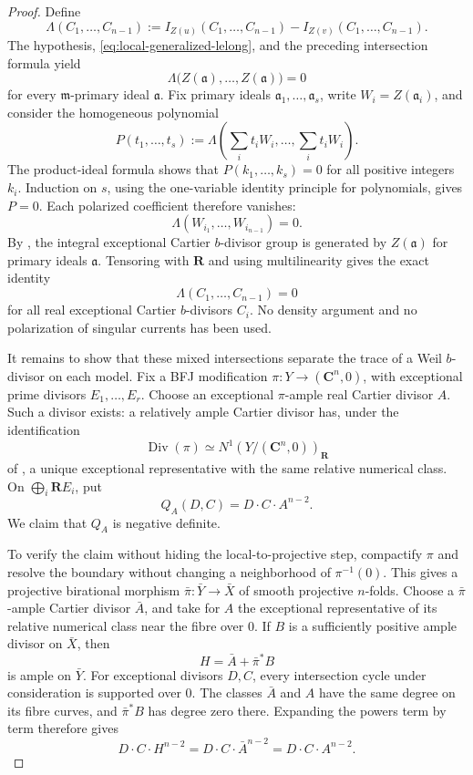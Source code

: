 \begin{proof}
Define
\[
 \Lambda(C_1,\ldots,C_{n-1})
 :=I_{Z(u)}(C_1,\ldots,C_{n-1})
   -I_{Z(v)}(C_1,\ldots,C_{n-1}).
\]
The hypothesis, \eqref{eq:local-generalized-lelong}, and the preceding
intersection formula yield
\[
 \Lambda\bigl(Z(\mathfrak a),\ldots,Z(\mathfrak a)\bigr)=0
\]
for every \(\mathfrak m\)-primary ideal \(\mathfrak a\).
Fix primary ideals \(\mathfrak a_1,\ldots,\mathfrak a_s\), write
\(W_i=Z(\mathfrak a_i)\), and consider the homogeneous polynomial
\[
 P(t_1,\ldots,t_s)
 :=\Lambda\!\left(\sum_i t_iW_i,\ldots,\sum_i t_iW_i\right).
\]
The product-ideal formula shows that
\(P(k_1,\ldots,k_s)=0\) for all positive integers \(k_i\).  Induction on
\(s\), using the one-variable identity principle for polynomials, gives
\(P=0\).  Each polarized coefficient therefore vanishes:
\[
             \Lambda(W_{i_1},\ldots,W_{i_{n-1}})=0.
\]
By \cite[Proposition~1.14]{BFJ08}, the integral exceptional Cartier
\(b\)-divisor group is generated by \(Z(\mathfrak a)\) for primary ideals
\(\mathfrak a\).  Tensoring with \(\mathbf R\) and using multilinearity
gives the exact identity
\[
             \Lambda(C_1,\ldots,C_{n-1})=0
\]
for all real exceptional Cartier \(b\)-divisors \(C_i\).  No density
argument and no polarization of singular currents has been used.

It remains to show that these mixed intersections separate the trace of a
Weil \(b\)-divisor on each model.  Fix a BFJ modification
\(\pi:Y\to(\mathbf C^n,0)\), with exceptional prime divisors
\(E_1,\ldots,E_r\).  Choose an exceptional \(\pi\)-ample real Cartier
divisor \(A\).  Such a divisor exists: a relatively ample Cartier divisor
has, under the identification
\[
             \operatorname{Div}(\pi)\simeq
             N^1(Y/(\mathbf C^n,0))_{\mathbf R}
\]
of \cite[\S1.2]{BFJ08}, a unique exceptional representative with the same
relative numerical class.  On \(\bigoplus_i\mathbf R E_i\), put
\[
                         Q_A(D,C)=D\cdot C\cdot A^{n-2}.
\]
We claim that \(Q_A\) is negative definite.

To verify the claim without hiding the local-to-projective step, compactify
\(\pi\) and resolve the boundary without changing a neighborhood of
\(\pi^{-1}(0)\).  This gives a projective birational morphism
\(\bar\pi:\bar Y\to\bar X\) of smooth projective \(n\)-folds.  Choose a
\(\bar\pi\)-ample Cartier divisor \(\bar A\), and take for \(A\) the
exceptional representative of its relative numerical class near the fibre
over \(0\).  If \(B\) is a sufficiently positive ample divisor on
\(\bar X\), then
\[
                         H=\bar A+\bar\pi^*B
\]
is ample on \(\bar Y\).  For exceptional divisors \(D,C\), every
intersection cycle under consideration is supported over \(0\).  The
classes \(\bar A\) and \(A\) have the same degree on its fibre curves, and
\(\bar\pi^*B\) has degree zero there.  Expanding the powers term by term
therefore gives
\[
       D\cdot C\cdot H^{n-2}
        =D\cdot C\cdot\bar A^{n-2}
        =D\cdot C\cdot A^{n-2}.
\]


\end{proof}
